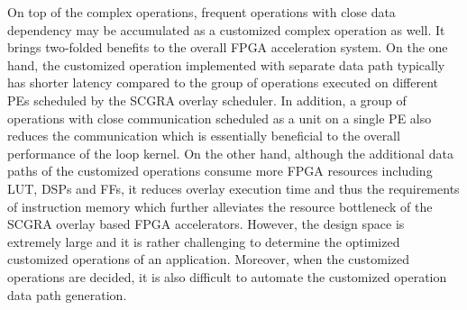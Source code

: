 On top of the complex operations, frequent operations with close data dependency may be accumulated as a customized complex operation as well. It brings two-folded benefits to the overall FPGA acceleration system. On the one hand, the customized operation implemented with separate data path typically has shorter latency compared to the group of operations executed on different PEs scheduled by the SCGRA overlay scheduler. In addition, a group of operations with close communication scheduled as a unit on a single PE also reduces the communication which is essentially beneficial to the overall performance of the loop kernel. On the other hand, although the additional data paths of the customized operations consume more FPGA resources including LUT, DSPs and FFs, it reduces overlay execution time and thus the requirements of instruction memory which further alleviates the resource bottleneck of the SCGRA overlay based FPGA accelerators. However, the design space is extremely large and it is rather challenging to determine the optimized customized operations of an application. Moreover, when the customized operations are decided, it is also difficult to automate the customized operation data path generation.
